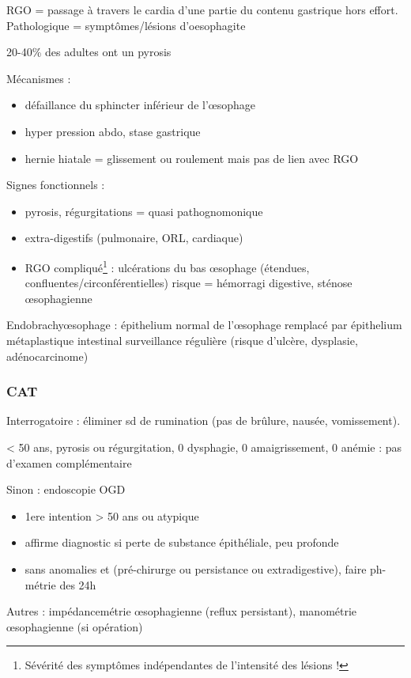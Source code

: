\documentclass[11pt]{article}
\begin{document}
\gls{RGO} = passage à travers le cardia d'une partie du contenu gastrique hors
effort. Pathologique = symptômes/lésions d'oesophagite

20-40\% des adultes ont un pyrosis

Mécanismes :
\begin{itemize}
\item défaillance du sphincter inférieur de l'\oe{}sophage
\item hyper pression abdo, stase gastrique
\item hernie hiatale = glissement ou roulement mais pas de lien avec RGO
\end{itemize}

Signes fonctionnels :
\begin{itemize}
\item pyrosis, régurgitations = quasi pathognomonique
\item extra-digestifs (pulmonaire, ORL, cardiaque)
\item RGO compliqué\footnote{Sévérité des symptômes indépendantes de l'intensité des lésions !} : ulcérations du bas \oe{}sophage (étendues,
confluentes/circonférentielles) \thus risque = hémorragi digestive, sténose
\oe{}sophagienne
\end{itemize}

Endobrachy\oe{}sophage : épithelium normal de l'\oe{}sophage remplacé par épithelium
métaplastique intestinal \thus surveillance régulière (risque d'ulcère,
dysplasie, adénocarcinome)

\subsubsection{CAT}
\label{sec:org47a2b34}
Interrogatoire : éliminer sd de rumination (pas de brûlure, nausée,
vomissement).

< 50 ans, pyrosis ou régurgitation, 0 dysphagie, 0 amaigrissement, 0 anémie :
pas d'examen complémentaire

Sinon : endoscopie OGD 
\begin{itemize}
\item 1ere intention > 50 ans ou atypique
\item affirme diagnostic si perte de substance épithéliale, peu profonde
\item sans anomalies et (pré-chirurge ou persistance ou extradigestive), faire
ph-métrie des 24h
\end{itemize}
Autres : impédancemétrie \oe{}sophagienne (reflux persistant), manométrie
\oe{}sophagienne (si opération)
\end{document}
